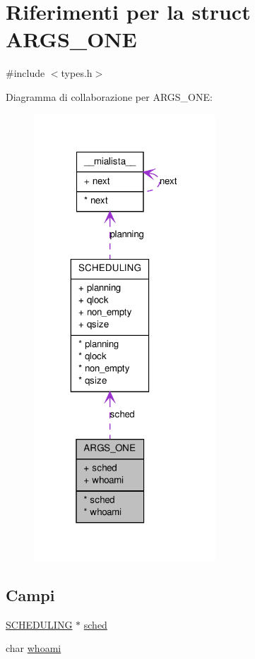 \hypertarget{structARGS__ONE}{
\section{Riferimenti per la struct ARGS\_\-ONE}
\label{structARGS__ONE}
}


{\ttfamily \#include $<$types.h$>$}



Diagramma di collaborazione per ARGS\_\-ONE:
\nopagebreak
\begin{figure}[H]
\begin{center}
\leavevmode
\includegraphics[width=193pt]{structARGS__ONE__coll__graph}
\end{center}
\end{figure}
\subsection*{Campi}
{\bf }\par
\begin{DoxyCompactItemize}
\item 
\hyperlink{structSCHEDULING}{SCHEDULING} $\ast$ \hyperlink{structARGS__ONE_a2ab0ae198a435c7ac8eba5989ff4650b}{sched}
\item 
char \hyperlink{structARGS__ONE_a655646e2e844c6563932c042bdeed66c}{whoami}
\end{DoxyCompactItemize}



